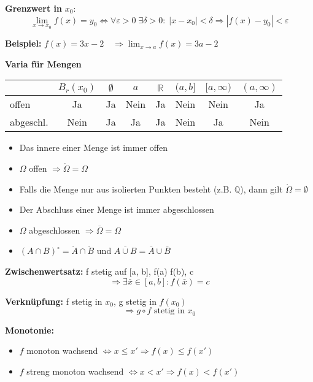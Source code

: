 \begin{itemize}
\textbf{Grenzwert in } $x_0$:  
\[
\lim_{x \to x_0} f(x) = y_0 \Leftrightarrow
\forall \varepsilon > 0\; \exists \delta > 0:\; |x - x_0| < \delta \Rightarrow |f(x) - y_0| < \varepsilon
\]

\textbf{Beispiel:}  
$f(x) = 3x - 2 \quad \Rightarrow \lim_{x \to a} f(x) = 3a - 2$

\textbf{Varia für Mengen}
\begin{center}
\begin{tabular}{l c c c c c c c}
\toprule
& $B_r(x_0)$ & $\emptyset$ & $a$ & $\mathbb{R}$ & $(a,b]$ & $[a,\infty)$ & $(a,\infty)$ \\
\midrule
offen & Ja & Ja & Nein & Ja & Nein & Nein & Ja \\
abgeschl. & Nein & Ja & Ja & Ja & Nein & Ja & Nein \\
\bottomrule
\end{tabular}
\end{center}
\begin{itemize}[leftmargin=1.5em]
  \item Das innere einer Menge ist immer offen
  \item $\Omega$ offen $\Rightarrow \mathring{\Omega} = \Omega$
  \item Falls die Menge nur aus isolierten Punkten besteht (z.B. $\mathbb{Q}$), dann gilt $\mathring{\Omega} = \emptyset$
  \item Der Abschluss einer Menge ist immer abgeschlossen
  \item $\Omega$ abgeschlossen $\Rightarrow \overline{\Omega} = \Omega$
  \item $(A \cap B)^\circ = \mathring{A} \cap \mathring{B}$ \quad und \quad $\overline{A \cup B} = \overline{A} \cup \overline{B}$
\end{itemize}

\textbf{Zwischenwertsatz:}  
f stetig auf [a, b],\; f(a) \leq f(b),\; c \in [f(a), f(b)]  
\[
\Rightarrow \exists \bar{x} \in [a, b]: f(\bar{x}) = c
\]

\textbf{Verknüpfung:}  
f stetig in \( x_0 \),\; g stetig in \( f(x_0) \)  
\[
\Rightarrow g \circ f \text{ stetig in } x_0
\]

\textbf{Monotonie:}
\begin{itemize}
  \item \(f\) monoton wachsend \(\Leftrightarrow x \le x' \Rightarrow f(x) \le f(x')\)
  \item \(f\) streng monoton wachsend \(\Leftrightarrow x < x' \Rightarrow f(x) < f(x')\)
\end{itemize}


\end{itemize}
